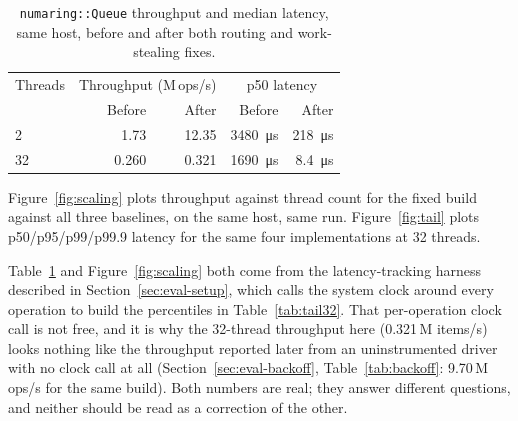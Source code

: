 \documentclass[10pt,journal,compsoc]{IEEEtran}
\begin{document}
\begin{table}[t]
\caption{\texttt{numaring::Queue} throughput and median latency, same host, before and after both
routing and work-stealing fixes.}
\label{tab:worksteal}
\centering\small
\begin{tabular}{lrrrr}
\toprule
Threads & \multicolumn{2}{c}{Throughput (M\,ops/s)} & \multicolumn{2}{c}{p50 latency} \\
 & Before & After & Before & After \\
\midrule
2  & 1.73  & 12.35 & \SI{3480}{\micro\second} & \SI{218}{\micro\second} \\
32 & 0.260 & 0.321 & \SI{1690}{\micro\second} & \SI{8.4}{\micro\second} \\
\bottomrule
\end{tabular}
\end{table}

Figure~\ref{fig:scaling} plots throughput against thread count for the fixed build against all
three baselines, on the same host, same run. Figure~\ref{fig:tail} plots p50/p95/p99/p99.9 latency
for the same four implementations at 32 threads.

Table~\ref{tab:worksteal} and Figure~\ref{fig:scaling} both come from the latency-tracking harness
described in Section~\ref{sec:eval-setup}, which calls the system clock around every operation to
build the percentiles in Table~\ref{tab:tail32}. That per-operation clock call is not free, and it
is why the 32-thread throughput here (0.321\,M items/s) looks nothing like the throughput reported
later from an uninstrumented driver with no clock call at all (Section~\ref{sec:eval-backoff},
Table~\ref{tab:backoff}: 9.70\,M ops/s for the same build). Both numbers are real; they answer
different questions, and neither should be read as a correction of the other.
\end{document}
